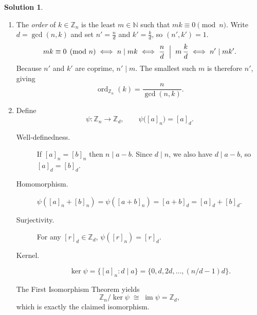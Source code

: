\documentclass[12pt]{article}
\theoremstyle{definition} %
\newtheorem{solution}{Solution}
\theoremstyle{plain} %
\begin{document}
\begin{solution}
  \begin{enumerate}[label=\textbf{(\alph*)}]
    \item
      The \emph{order} of $k\in\mathbb{Z}_n$ is the least $m\in\mathbb{N}$ such that
      $mk \equiv 0 \pmod{n}$.
      Write $d=\gcd(n,k)$ and set $n'=\tfrac{n}{d}$ and $k'=\tfrac{k}{d}$,
      so $(n',k')=1$.
      \[
        mk\equiv 0 \pmod{n}
        \;\Longleftrightarrow\;
        n \mid mk
        \;\Longleftrightarrow\;
        \frac{n}{d}\;\Bigm|\; m\,\frac{k}{d}
        \;\Longleftrightarrow\;
        n' \mid m k'.
      \]
      Because $n'$ and $k'$ are coprime, $n'\mid m$.
      The smallest such $m$ is therefore $n'$,
      giving
      \[
        \boxed{\operatorname{ord}_{\mathbb{Z}_n}(k)=\frac{n}{\gcd(n,k)}}.
      \]

    \item
      Define
      \[
        \psi:\mathbb{Z}_n \longrightarrow \mathbb{Z}_d, \qquad
        \psi\bigl([a]_n\bigr)=[a]_d.
      \]
      \begin{description}
        \item[Well‑definedness.]
          If $[a]_n=[b]_n$ then $n\mid a-b$.  Since $d\mid n$, we also have
          $d\mid a-b$, so $[a]_d=[b]_d$.
        \item[Homomorphism.]
          \(
            \psi([a]_n+[b]_n)=\psi([a+b]_n)=[a+b]_d=[a]_d+[b]_d
          \).
        \item[Surjectivity.]
          For any $[r]_d\in\mathbb{Z}_d$, $\psi([r]_n)=[r]_d$.
        \item[Kernel.]
          \[
            \ker\psi
              =\{[a]_n : d\mid a\}
              =\{0,d,2d,\dots,(n/d-1)d\}.
          \]
      \end{description}

      The First Isomorphism Theorem yields
      \[
        \mathbb{Z}_n/\ker\psi \;\cong\; \operatorname{im}\psi = \mathbb{Z}_d,
      \]
      which is exactly the claimed isomorphism.
      \qedhere
  \end{enumerate}
\end{solution}
\end{document}
